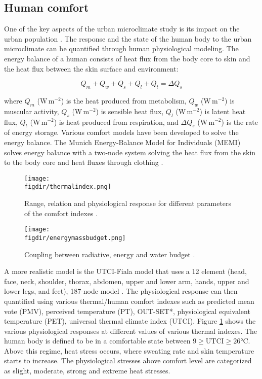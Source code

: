 \subsection{Human comfort}

One of the key aspects of the urban microclimate study is its impact on the urban population \citep{Oke2017a,Saneinejad2013}. The response and the state of the human body to the urban microclimate can be quantified through human physiological modeling. The energy balance of a human consists of heat flux from the body core to skin and the heat flux between the skin surface and environment:

	\begin{equation}
	Q_m + Q_w + Q_s + Q_l + Q_t =  \Delta Q_s
	\end{equation}

where $Q_m$ (W\,m$^{-2}$) is the heat produced from metabolism, $Q_w$ (W\,m$^{-2}$) is muscular activity, $Q_s$ (W\,m$^{-2}$) is sensible heat flux, $Q_l$ (W\,m$^{-2}$) is latent heat flux, $Q_t$ (W\,m$^{-2}$) is heat produced from respiration, and $\Delta Q_s$ (W\,m$^{-2}$) is the rate of energy storage. Various comfort models have been developed to solve the energy balance. The Munich Energy-Balance Model for Individuals (MEMI) solves energy balance with a two-node system solving the heat flux from the skin to the body core and heat fluxes through clothing \citep{Hoppe1999}. 

	\begin{figure}[p]
		\centering
		\texttt{[image: \\figdir/thermalindex.png]}
		\caption{Range, relation and physiological response for different parameters of the comfort indexes \citep{Oke2017,Matzarakis1999,Bazejczyk2013}.}
		\label{fig:thermalindex}
	\end{figure}
	
	\begin{figure}[p]
	\centering
	\texttt{[image: \\figdir/energymassbudget.png]}
	\caption{Coupling between radiative, energy and water budget \citep{Sawinski2011}.}
	\label{fig:energymassbudget}
	\end{figure}


A more realistic model is the UTCI-Fiala model that uses a 12 element (head, face, neck, shoulder, thorax, abdomen, upper and lower arm, hands, upper and lower legs, and feet), 187-node model \citep{Fiala2001,Brode2012,Blazejczyk2012,Jendritzky2012,Bazejczyk2013,Lokys2015}. The physiological response can then quantified using various thermal/human comfort indexes such as predicted mean vote (PMV), perceived temperature (PT), OUT-SET*, physiological equivalent temperature (PET), universal thermal climate index (UTCI). Figure \ref{fig:thermalindex} shows the various physiological responses at different values of various thermal indexes. The human body is defined to be in a comfortable state between $9\ge \mathrm{UTCI} \ge 26$\si{\celsius}. Above this regime, heat stress occurs, where sweating rate and skin temperature starts to increase. The physiological stresses above comfort level are categorized as slight, moderate, strong and extreme heat stresses.

